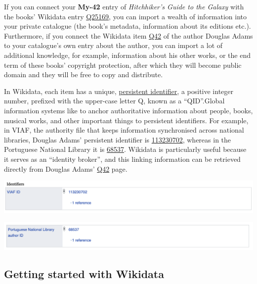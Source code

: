 \documentclass[
  letterpaper,
  DIV=11,
  numbers=noendperiod]{scrreprt}
\begin{document}
If you can connect your \textbf{My-42} entry of \emph{Hitchhiker's Guide
to the Galaxy} with the books' Wikidata entry
\href{https://www.wikidata.org/wiki/Q25169}{Q25169}, you can import a
wealth of information into your private catalogue (the book's metadata,
information about its editions etc.). Furthermore, if you connect the
Wikidata item \href{https://www.wikidata.org/wiki/Q42}{Q42} of the
author Douglas Adams to your catalogue's own entry about the author, you
can import a lot of additional knowledge, for example, information about
his other works, or the end term of these books' copyright protection,
after which they will become public domain and they will be free to copy
and distribute.

In Wikidata, each item has a unique,
\href{https://en.wikipedia.org/wiki/Persistent_identifier}{persistent
identifier}, a positive integer number, prefixed with the upper-case
letter Q, known as a ``QID''.Global information systems like to anchor
authoritative information about people, books, musical works, and other
important things to persistent identifiers. For example, in VIAF, the
authority file that keeps information synchronised across national
libraries, Douglas Adams' persistent identifier is
\href{https://viaf.org/viaf/113230702/}{113230702}, whereas in the
Portuguese National Library it is
\href{http://id.bnportugal.gov.pt/aut/catbnp/68537}{68537}. Wikidata is
particularly useful because it serves as an ``identity broker'', and
this linking information can be retrieved directly from Douglas Adams'
\href{https://www.wikidata.org/wiki/Q42}{Q42} page.

\begin{center}
\includegraphics{png/wikidata-tutorial/Douglas-Adams_VIAF-identifier.png}
\end{center}

\begin{center}
\includegraphics{png/wikidata-tutorial/Douglas-Adams_portugal-national-library-identifier.png}
\end{center}

\subsection{Getting started with
Wikidata}\label{sec-getting-started-wikidata}
\end{document}
